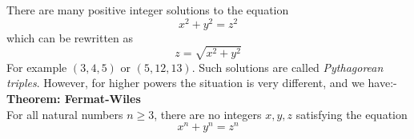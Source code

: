 \documentclass[a4paper]{article}
\begin{document}
There are many positive integer solutions to the equation
\[x^2 + y^2 = z^2\]
which can be rewritten as
\[z = \sqrt{x^2 + y^2}\]
For example \((3, 4, 5)\) or \((5, 12, 13)\). Such solutions are called \textit{Pythagorean
triples}.\newline
However, for higher powers the situation is very different, and we have:-\\
\textbf{Theorem: Fermat-Wiles}\\
For all natural numbers \(n \ge 3\), there are no integers \(x, y, z\) satisfying the
equation
\[x^n + y^n = z^n\]
\end{document}
